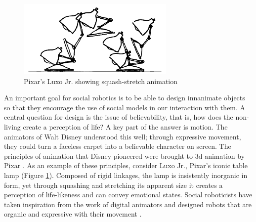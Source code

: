 
   \begin{figure}[thpb]
      \centering
      \includegraphics[width=3in]{figures/intro/pixar_luxo_jr.png}
      \caption{Pixar's Luxo Jr. showing squash-stretch animation \cite{lasseter_computer_animation}}
      \label{pixar_luxo_jr}
   \end{figure}


An important goal for social robotics is to be able to design innanimate objects so that they encourage the use of social models in our interaction with them.  A central question for design is the issue of believability, that is, how does the non-living create a perception of life? \cite{bates_believability} A key part of the answer is motion. The animators of Walt Disney understood this well; through expressive movement, they could turn a faceless carpet into a believable character on screen. The principles of animation that Disney pioneered were brought to 3d animation by Pixar \cite{lasseter_computer_animation}. As an example of these principles, consider Luxo Jr., Pixar's iconic table lamp (Figure \ref{pixar_luxo_jr}). Composed of rigid linkages, the lamp is insistently inorganic in form, yet through squashing and stretching its apparent size it creates a perception of life-likeness and can convey emotional states. Social roboticists have taken inspiration from the work of digital animators and designed robots that are organic and expressive with their movement \cite{hoffman_robot_movement}.  

